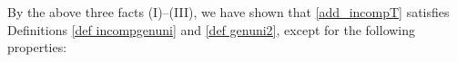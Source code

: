 \documentclass{article}
\newcommand{\1}{\mathds{1}}
\numberwithin{equation}{section}
\newcommand{\al}{\alpha}
\newcommand{\fa}{{\mathfrak a}}
\newcommand{\fb}{{\mathfrak b}}
\renewcommand{\leq}{\leqslant}
\renewcommand{\le}{\leq}
\newcommand{\dashed}{\text{diffusive}}
\theoremstyle{plain} %
\theoremstyle{remark}
\newcommand{\wtSdelta}{\Sigma}
\newcommand{\wtSdeltan}{\Sigma^{(n)}}
\newcommand{\Sele}{{\mathcal E}}
\newcommand{\PIT}{\mathcal R_{IT}}
\newcommand{\wtPIT}{\widetilde{\mathcal R}_{IT}}
\newcommand{\QIT}{\mathcal Q_{IT}}
\newcommand{\AIT}{\mathcal A_{IT}}
\begin{document}
%
%
%
By the above three facts (I)--(III), we have shown that \eqref{add_incompT} satisfies Definitions \ref{def incompgenuni} and \ref{def genuni2}, except for the following properties:
\end{document}
